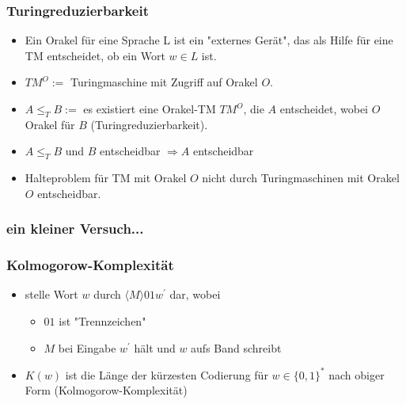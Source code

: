 \documentclass{beamer}
\begin{document}
\begin{frame}
\frametitle{Turingreduzierbarkeit}
\begin{itemize}
\item Ein Orakel für eine Sprache L ist ein "externes Gerät", das als Hilfe für eine TM entscheidet, ob ein Wort $w\in L$ ist.
\item $TM^O:=$ Turingmaschine mit Zugriff auf Orakel $O$.\pause
\item $A \leq_T B :=$ es existiert eine Orakel-TM $TM^O$, die $A$ entscheidet, wobei $O$ Orakel für $B$ (Turingreduzierbarkeit).\pause
\item $A \leq_T B$ und $B$ entscheidbar $\Rightarrow A$ entscheidbar
\item Halteproblem für TM mit Orakel $O$ nicht durch Turingmaschinen mit Orakel $O$ entscheidbar.
\end{itemize}
\end{frame}

\begin{frame}
\frametitle{ein kleiner Versuch...}
\end{frame}

\begin{frame}
\frametitle{Kolmogorow-Komplexität}
\begin{itemize}
\item stelle Wort $w$ durch $\langle M\rangle 01w^\prime$ dar, wobei
\begin{itemize}
\item $01$ ist "Trennzeichen"
\item $M$ bei Eingabe $w^\prime$ hält und $w$ aufs Band schreibt
\end{itemize}\pause
\item $K(w)$ ist die Länge der kürzesten Codierung für $w\in\{0,1\}^*$ nach obiger Form (Kolmogorow-Komplexität)
\end{itemize}
\end{frame}
\end{document}
